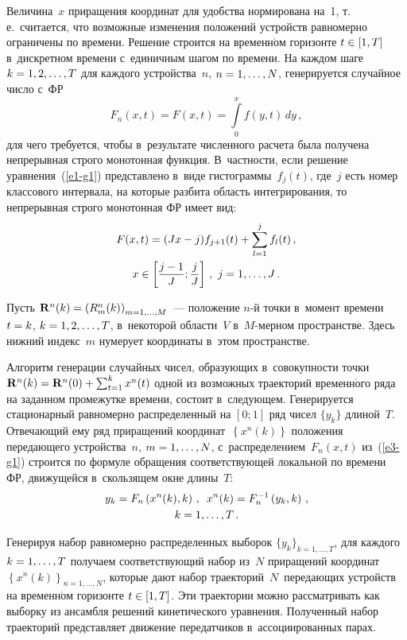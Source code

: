 \begin{multicols}{2}
  Величина~$x$ приращения координат для удобства нормирована на~1, т.\,е.\ 
считается, что возможные изменения положений устройств равномерно 
ограничены по времени. Решение строится на временн$\acute{\mbox{о}}$м горизонте $t\hm\in 
[1,T]$ в~дискретном времени с~единичным шагом по времени. На каж\-дом шаге 
$k\hm=1,2,\ldots , T$ для каждого устройства~$n$, $n\hm=1,\ldots , N$, 
генерируется случайное число с~ФР 
$$
F_n(x,t) = F(x,t) = \int\limits_0^x  f(y,t)\,dy\,,
$$
 для чего требуется, чтобы в~результате чис\-лен\-но\-го расчета была 
получена непрерывная строго монотонная функ\-ция. В~част\-ности, если решение 
уравнения~(\ref{e1-g1}) пред\-став\-ле\-но в~виде гистограммы~$f_j(t)$, где~$j$ есть 
номер классового интервала, на которые разбита об\-ласть интегрирования, то 
непрерывная строго монотонная ФР имеет вид: 
  \begin{multline}
  F(x,t) =(Jx-j) f_{j+1}(t) +\sum\limits^j_{l=1} f_l(t)\,,\\
  x\in \left[\displaystyle\frac{\displaystyle j-1\mathstrut}{\displaystyle J\mathstrut}; \displaystyle\frac{\displaystyle j\mathstrut}{\displaystyle J\mathstrut}\right]\,,\ j=1,\ldots , J\,.
  \label{e3-g1}
  \end{multline}
  
  Пусть $\mathbf{R}^n(k)\hm= \left( R_m^n(k)\right)_{m=1,\ldots , M}$~--- 
положение $n$-й точки в~момент времени $t\hm=k$, $k\hm= 1, 2,\ldots ,T$,  
в~некоторой области~$V$ в~$M$-мер\-ном пространстве. Здесь нижний 
индекс~$m$ нумерует координаты в~этом пространстве. 

Алгоритм генерации 
случайных чисел, образующих в~совокупности точки $\mathbf{R}^n(k)\hm= 
\mathbf{R}^n(0)\hm+\sum\nolimits^k_{t=1} x^n(t)$ одной из возможных 
траекторий временн$\acute{\mbox{о}}$го ряда на заданном промежутке времени, состоит 
в~следующем. Генерируется стационарный равномерно распределенный на 
$[0;1]$ ряд чисел $\{y_k\}$ длиной~$T$. Отвечающий ему ряд приращений 
координат~$\left\{ x^n(k)\right\}$ положения передающего устройства~$n$, 
$m\hm=1,\ldots ,N$, с~распределением~$F_n(x,t)$ из~(\ref{e3-g1}) строится по 
формуле обращения соответствующей локальной по времени 
ФР, движущейся в~скользящем окне длины~$T$:
  \begin{multline}
  y_k=F_n\left (x^n(k),k\right)\,,\enskip  
  x^n(k)=F_n^{-1} \left( y_k,k\right)\,,\\
   k=1,\ldots, T\,.
  \label{e4-g1}
  \end{multline}
  
  Генерируя набор равномерно распределенных выборок  
$\{y_k\}_{k=1,\ldots, T}$, для каждого $k\hm=1,\ldots, T$ получаем 
соответствующий набор из~$N$ приращений координат $\left\{ 
x^n(k)\right\}_{n=1,\ldots, N}$, которые дают набор 
траекторий~$N$~передающих устройств на временн$\acute{\mbox{о}}$м горизонте $t\hm\in 
[1,T]$. Эти траектории можно рас\-смат\-ри\-вать как выборку из ансамбля решений 
кинетического уравнения. Полученный набор траекторий представляет 
движение передатчиков в~ассоциирован\-ных парах. 
  

\end{multicols}
